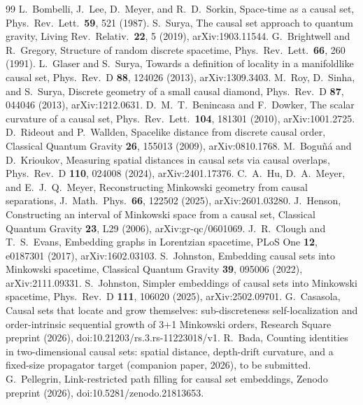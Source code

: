 \documentclass[prd,twocolumn,superscriptaddress,nofootinbib,amsmath,amssymb,floatfix]{revtex4-2}
\begin{document}
\begin{thebibliography}{99}
 L.~Bombelli, J.~Lee, D.~Meyer, and R.~D.~Sorkin, Space-time as a causal set, Phys.\ Rev.\ Lett.\ \textbf{59}, 521 (1987).
 S.~Surya, The causal set approach to quantum gravity, Living Rev.\ Relativ.\ \textbf{22}, 5 (2019), arXiv:1903.11544.
 G.~Brightwell and R.~Gregory, Structure of random discrete spacetime, Phys.\ Rev.\ Lett.\ \textbf{66}, 260 (1991).
 L.~Glaser and S.~Surya, Towards a definition of locality in a manifoldlike causal set, Phys.\ Rev.\ D \textbf{88}, 124026 (2013), arXiv:1309.3403.
 M.~Roy, D.~Sinha, and S.~Surya, Discrete geometry of a small causal diamond, Phys.\ Rev.\ D \textbf{87}, 044046 (2013), arXiv:1212.0631.
 D.~M.~T.~Benincasa and F.~Dowker, The scalar curvature of a causal set, Phys.\ Rev.\ Lett.\ \textbf{104}, 181301 (2010), arXiv:1001.2725.
 D.~Rideout and P.~Wallden, Spacelike distance from discrete causal order, Classical Quantum Gravity \textbf{26}, 155013 (2009), arXiv:0810.1768.
 M.~Bogu\~n\'a and D.~Krioukov, Measuring spatial distances in causal sets via causal overlaps, Phys.\ Rev.\ D \textbf{110}, 024008 (2024), arXiv:2401.17376.
 C.~A.~Hu, D.~A.~Meyer, and E.~J.~Q.~Meyer, Reconstructing Minkowski geometry from causal separations, J.\ Math.\ Phys.\ \textbf{66}, 122502 (2025), arXiv:2601.03280.
 J.~Henson, Constructing an interval of Minkowski space from a causal set, Classical Quantum Gravity \textbf{23}, L29 (2006), arXiv:gr-qc/0601069.
 J.~R.~Clough and T.~S.~Evans, Embedding graphs in Lorentzian spacetime, PLoS One \textbf{12}, e0187301 (2017), arXiv:1602.03103.
 S.~Johnston, Embedding causal sets into Minkowski spacetime, Classical Quantum Gravity \textbf{39}, 095006 (2022), arXiv:2111.09331.
 S.~Johnston, Simpler embeddings of causal sets into Minkowski spacetime, Phys.\ Rev.\ D \textbf{111}, 106020 (2025), arXiv:2502.09701.
 G.~Casasola, Causal sets that locate and grow themselves: sub-discreteness self-localization and order-intrinsic sequential growth of 3+1 Minkowski orders, Research Square preprint (2026), doi:10.21203/rs.3.rs-11223018/v1.
 R.~Bada, Counting identities in two-dimensional causal sets: spatial distance, depth-drift curvature, and a fixed-size propagator target (companion paper, 2026), to be submitted.
 G.~Pellegrin, Link-restricted path filling for causal set embeddings, Zenodo preprint (2026), doi:10.5281/zenodo.21813653.

\end{thebibliography}
\end{document}
